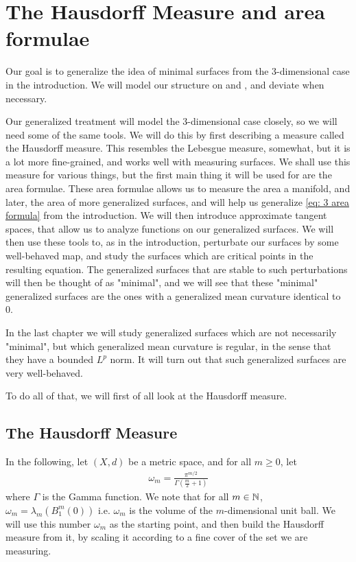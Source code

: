 \chapter{The Hausdorff Measure and area formulae}
Our goal is to generalize the idea of minimal surfaces from the 3-dimensional case in the introduction. We will model our structure on \cite{simon2014introduction} and \cite{holopainen16}, and deviate when necessary.

Our generalized treatment will model the 3-dimensional case closely, so we will need some of the same tools. We will do this by first describing a measure called the Hausdorff measure. This resembles the Lebesgue measure, somewhat, but it is a lot more fine-grained, and works well with measuring surfaces. We shall use this measure for various things, but the first main thing it will be used for are the area formulae. These area formulae allows us to measure the area a manifold, and later, the area of more generalized surfaces, and will help us generalize \eqref{eq: 3 area formula} from the introduction. 
We will then introduce approximate tangent spaces, that allow us to analyze functions on our generalized surfaces. We will then use these tools to, as in the introduction, perturbate our surfaces by some well-behaved map, and study the surfaces which are critical points in the resulting equation. The generalized surfaces that are stable to such perturbations will then be thought of as "minimal", and we will see that these "minimal" generalized surfaces are the ones with a generalized mean curvature identical to 0.

In the last chapter we will study generalized surfaces which are not necessarily "minimal", but which generalized mean curvature is regular, in the sense that they have a bounded $L^p$ norm. It will turn out that such generalized surfaces are very well-behaved.

To do all of that, we will first of all look at the Hausdorff measure.

\section{The Hausdorff Measure}

In the following, let $(X,d)$ be a metric space, and for all $m \ge 0$, let
\begin{align*}
	\omega_{m} = \frac{ \pi^{m/2 } }{ \Gamma(\frac{m}{2} + 1) }
\end{align*}
where $\Gamma$ is the Gamma function. We note that for all $m \in \mathbb{N}$, $\omega_{m} = \lambda_{m}(B_{1}^{m}(0))$ i.e. $\omega_{m}$ is the volume of the $m$-dimensional unit ball. We will use this number $\omega_{m}$ as the starting point, and then build the Hausdorff measure from it, by scaling it according to a fine cover of the set we are measuring.

